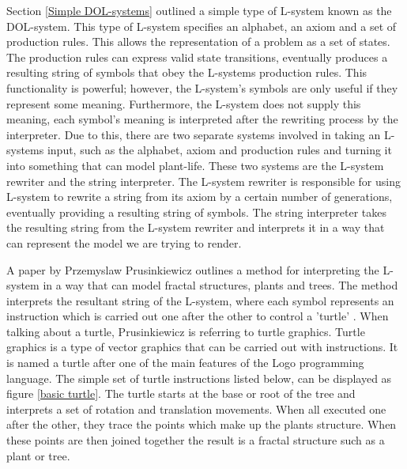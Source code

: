 Section \ref{Simple DOL-systems} outlined a simple type of L-system known as the DOL-system. This type of L-system specifies an alphabet, an axiom and a set of production rules. This allows the representation of a problem as a set of states. The production rules can express valid state transitions, eventually produces a resulting string of symbols that obey the L-systems production rules. This functionality is powerful; however, the L-system's symbols are only useful if they represent some meaning. Furthermore, the L-system does not supply this meaning, each symbol's meaning is interpreted after the rewriting process by the interpreter. Due to this, there are two separate systems involved in taking an L-systems input, such as the alphabet, axiom and production rules and turning it into something that can model plant-life. These two systems are the L-system rewriter and the string interpreter. The L-system rewriter is responsible for using L-system to rewrite a string from its axiom by a certain number of generations, eventually providing a resulting string of symbols. The string interpreter takes the resulting string from the L-system rewriter and interprets it in a way that can represent the model we are trying to render. 

A paper by Przemyslaw Prusinkiewicz outlines a method for interpreting the L-system in a way that can model fractal structures, plants and trees. The method interprets the resultant string of the L-system, where each symbol represents an instruction which is carried out one after the other to control a 'turtle' \cite{prusinkiewicz1986graphical}. When talking about a turtle, Prusinkiewicz is referring to turtle graphics. Turtle graphics is a type of vector graphics that can be carried out with instructions. It is named a turtle after one of the main features of the Logo programming language. The simple set of turtle instructions listed below, can be displayed as figure \ref{basic turtle}. The turtle starts at the base or root of the tree and interprets a set of rotation and translation movements. When all executed one after the other, they trace the points which make up the plants structure. When these points are then joined together the result is a fractal structure such as a plant or tree.

